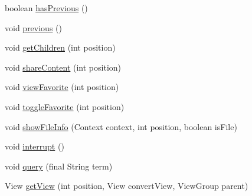 \begin{DoxyCompactItemize}
boolean \hyperlink{classcom_1_1zia_1_1freshdocs_1_1widget_1_1adapter_1_1_c_m_i_s_adapter_a002e4ca28da204dd02d8682857652bf4}{has\-Previous} ()
\item 
void \hyperlink{classcom_1_1zia_1_1freshdocs_1_1widget_1_1adapter_1_1_c_m_i_s_adapter_acb349739dc13b8b8aa767716b0569ee3}{previous} ()
\item 
void \hyperlink{classcom_1_1zia_1_1freshdocs_1_1widget_1_1adapter_1_1_c_m_i_s_adapter_ae60eae047024104bc71f3a94f1e3f2d2}{get\-Children} (int position)
\item 
void \hyperlink{classcom_1_1zia_1_1freshdocs_1_1widget_1_1adapter_1_1_c_m_i_s_adapter_a2e8d72a8448a4dc6355196ac7634123d}{share\-Content} (int position)
\item 
void \hyperlink{classcom_1_1zia_1_1freshdocs_1_1widget_1_1adapter_1_1_c_m_i_s_adapter_a3c7dcfc0bf0c68000e807839ad54a62d}{view\-Favorite} (int position)
\item 
void \hyperlink{classcom_1_1zia_1_1freshdocs_1_1widget_1_1adapter_1_1_c_m_i_s_adapter_ac9acc399a247ad3f59d85f0b5a965806}{toggle\-Favorite} (int position)
\item 
void \hyperlink{classcom_1_1zia_1_1freshdocs_1_1widget_1_1adapter_1_1_c_m_i_s_adapter_af4a58a33520d8f9af53ab1539c95fce3}{show\-File\-Info} (Context context, int position, boolean is\-File)
\item 
void \hyperlink{classcom_1_1zia_1_1freshdocs_1_1widget_1_1adapter_1_1_c_m_i_s_adapter_a39275cb5044873bd6f9916bb9227dba6}{interrupt} ()
\item 
void \hyperlink{classcom_1_1zia_1_1freshdocs_1_1widget_1_1adapter_1_1_c_m_i_s_adapter_a2e6f7ee295c34fa060f73cb7ea097690}{query} (final String term)
\item 
View \hyperlink{classcom_1_1zia_1_1freshdocs_1_1widget_1_1adapter_1_1_c_m_i_s_adapter_a3701caa327003d41f2e8c3c3b185b7c9}{get\-View} (int position, View convert\-View, View\-Group parent)
\end{DoxyCompactItemize}
